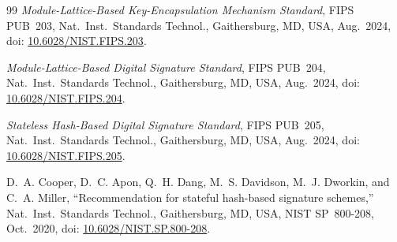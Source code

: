 \documentclass[11pt,a4paper]{article}
\begin{document}
\begin{thebibliography}{99}
\emph{Module-Lattice-Based Key-Encapsulation Mechanism Standard}, FIPS PUB~203, Nat.\ Inst.\ Standards Technol., Gaithersburg, MD, USA, Aug.~2024, doi: \href{https://doi.org/10.6028/NIST.FIPS.203}{10.6028/NIST.FIPS.203}.

\emph{Module-Lattice-Based Digital Signature Standard}, FIPS PUB~204, Nat.\ Inst.\ Standards Technol., Gaithersburg, MD, USA, Aug.~2024, doi: \href{https://doi.org/10.6028/NIST.FIPS.204}{10.6028/NIST.FIPS.204}.

\emph{Stateless Hash-Based Digital Signature Standard}, FIPS PUB~205, Nat.\ Inst.\ Standards Technol., Gaithersburg, MD, USA, Aug.~2024, doi: \href{https://doi.org/10.6028/NIST.FIPS.205}{10.6028/NIST.FIPS.205}.

D.~A. Cooper, D.~C. Apon, Q.~H. Dang, M.~S. Davidson, M.~J. Dworkin, and C.~A. Miller, ``Recommendation for stateful hash-based signature schemes,'' Nat.\ Inst.\ Standards Technol., Gaithersburg, MD, USA, NIST SP~800-208, Oct.~2020, doi: \href{https://doi.org/10.6028/NIST.SP.800-208}{10.6028/NIST.SP.800-208}.
\end{thebibliography}
\end{document}
